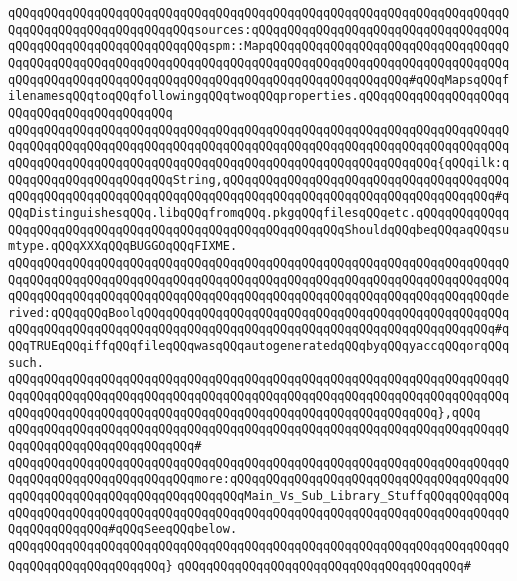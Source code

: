 \verb|qQQqqQQqqQQqqQQqqQQqqQQqqQQqqQQqqQQqqQQqqQQqqQQqqQQqqQQqqQQqqQQqqQQqqQQqqQQqqQQqqQQqqQQqqQQqqQQqsources:qQQqqQQqqQQqqQQqqQQqqQQqqQQqqQQqqQQqqQQqqQQqqQQqqQQqqQQqqQQqqQQqspm::MapqQQqqQQqqQQqqQQqqQQqqQQqqQQqqQQqqQQqqQQqqQQqqQQqqQQqqQQqqQQqqQQqqQQqqQQqqQQqqQQqqQQqqQQqqQQqqQQqqQQqqQQqqQQqqQQqqQQqqQQqqQQqqQQqqQQqqQQqqQQqqQQqqQQqqQQqqQQqqQQq#qQQqMapsqQQqfilenamesqQQqtoqQQqfollowingqQQqtwoqQQqproperties.qQQqqQQqqQQqqQQqqQQqqQQqqQQqqQQqqQQqqQQqqQQq|\newline
\verb|qQQqqQQqqQQqqQQqqQQqqQQqqQQqqQQqqQQqqQQqqQQqqQQqqQQqqQQqqQQqqQQqqQQqqQQqqQQqqQQqqQQqqQQqqQQqqQQqqQQqqQQqqQQqqQQqqQQqqQQqqQQqqQQqqQQqqQQqqQQqqQQqqQQqqQQqqQQqqQQqqQQqqQQqqQQqqQQqqQQqqQQqqQQqqQQqqQQqqQQq{qQQqilk:qQQqqQQqqQQqqQQqqQQqqQQqString,qQQqqQQqqQQqqQQqqQQqqQQqqQQqqQQqqQQqqQQqqQQqqQQqqQQqqQQqqQQqqQQqqQQqqQQqqQQqqQQqqQQqqQQqqQQqqQQqqQQqqQQqqQQq#qQQqDistinguishesqQQq.libqQQqfromqQQq.pkgqQQqfilesqQQqetc.qQQqqQQqqQQqqQQqqQQqqQQqqQQqqQQqqQQqqQQqqQQqqQQqqQQqqQQqqQQqShouldqQQqbeqQQqaqQQqsumtype.qQQqXXXqQQqBUGGOqQQqFIXME.|\newline
\verb|qQQqqQQqqQQqqQQqqQQqqQQqqQQqqQQqqQQqqQQqqQQqqQQqqQQqqQQqqQQqqQQqqQQqqQQqqQQqqQQqqQQqqQQqqQQqqQQqqQQqqQQqqQQqqQQqqQQqqQQqqQQqqQQqqQQqqQQqqQQqqQQqqQQqqQQqqQQqqQQqqQQqqQQqqQQqqQQqqQQqqQQqqQQqqQQqqQQqqQQqqQQqqQQqderived:qQQqqQQqBoolqQQqqQQqqQQqqQQqqQQqqQQqqQQqqQQqqQQqqQQqqQQqqQQqqQQqqQQqqQQqqQQqqQQqqQQqqQQqqQQqqQQqqQQqqQQqqQQqqQQqqQQqqQQqqQQqqQQqqQQq#qQQqTRUEqQQqiffqQQqfileqQQqwasqQQqautogeneratedqQQqbyqQQqyaccqQQqorqQQqsuch.|\newline
\verb|qQQqqQQqqQQqqQQqqQQqqQQqqQQqqQQqqQQqqQQqqQQqqQQqqQQqqQQqqQQqqQQqqQQqqQQqqQQqqQQqqQQqqQQqqQQqqQQqqQQqqQQqqQQqqQQqqQQqqQQqqQQqqQQqqQQqqQQqqQQqqQQqqQQqqQQqqQQqqQQqqQQqqQQqqQQqqQQqqQQqqQQqqQQqqQQqqQQqqQQq},qQQq|\newline
\verb|qQQqqQQqqQQqqQQqqQQqqQQqqQQqqQQqqQQqqQQqqQQqqQQqqQQqqQQqqQQqqQQqqQQqqQQqqQQqqQQqqQQqqQQqqQQqqQQq#|\newline
\verb|qQQqqQQqqQQqqQQqqQQqqQQqqQQqqQQqqQQqqQQqqQQqqQQqqQQqqQQqqQQqqQQqqQQqqQQqqQQqqQQqqQQqqQQqqQQqqQQqmore:qQQqqQQqqQQqqQQqqQQqqQQqqQQqqQQqqQQqqQQqqQQqqQQqqQQqqQQqqQQqqQQqqQQqqQQqMain_Vs_Sub_Library_StuffqQQqqQQqqQQqqQQqqQQqqQQqqQQqqQQqqQQqqQQqqQQqqQQqqQQqqQQqqQQqqQQqqQQqqQQqqQQqqQQqqQQqqQQqqQQqqQQq#qQQqSeeqQQqbelow.|\newline
\verb|qQQqqQQqqQQqqQQqqQQqqQQqqQQqqQQqqQQqqQQqqQQqqQQqqQQqqQQqqQQqqQQqqQQqqQQqqQQqqQQqqQQqqQQqqQQq}|\newline
\newline
\verb|qQQqqQQqqQQqqQQqqQQqqQQqqQQqqQQqqQQqqQQq#|\newline
